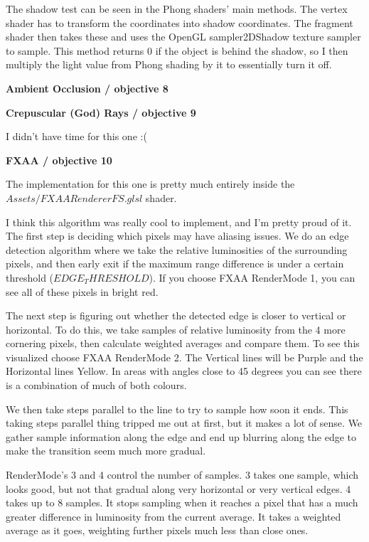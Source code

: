 \documentclass[10pt]{article}
\begin{document}
	The shadow test can be seen in the Phong shaders' main methods. The vertex shader has to transform the coordinates into shadow coordinates. The fragment shader then takes these and uses the OpenGL sampler2DShadow texture sampler to sample. This method returns 0 if the object is behind the shadow, so I then multiply the light value from Phong shading by it to essentially turn it off.
	
	\begin{center}
		\bf Ambient Occlusion / objective 8
	\end{center}
	
	\begin{center}
		\bf Crepuscular (God) Rays / objective 9
	\end{center}
	
	I didn't have time for this one :(
	
	\begin{center}
		\bf FXAA / objective 10
	\end{center}
	
	The implementation for this one is pretty much entirely inside the $Assets/FXAARendererFS.glsl$ shader.
	
	I think this algorithm was really cool to implement, and I'm pretty proud of it. The first step is deciding which pixels may have aliasing issues. We do an edge detection algorithm where we take the relative luminosities of the surrounding pixels, and then early exit if the maximum range difference is under a certain threshold ($EDGE_THRESHOLD$). If you choose FXAA RenderMode 1, you can see all of these pixels in bright red.
	
	The next step is figuring out whether the detected edge is closer to vertical or horizontal. To do this, we take samples of relative luminosity from the 4 more cornering pixels, then calculate weighted averages and compare them. To see this visualized choose FXAA RenderMode 2. The Vertical lines will be Purple and the Horizontal lines Yellow. In areas with angles close to 45 degrees you can see there is a combination of much of both colours.
	
	We then take steps parallel to the line to try to sample how soon it ends. This taking steps parallel thing tripped me out at first, but it makes a lot of sense. We gather sample information along the edge and end up blurring along the edge to make the transition seem much more gradual.
	
	RenderMode's 3 and 4 control the number of samples. 3 takes one sample, which looks good, but not that gradual along very horizontal or very vertical edges. 4 takes up to 8 samples. It stops sampling when it reaches a pixel that has a much greater difference in luminosity from the current average. It takes a weighted average as it goes, weighting further pixels much less than close ones.
\end{document}
